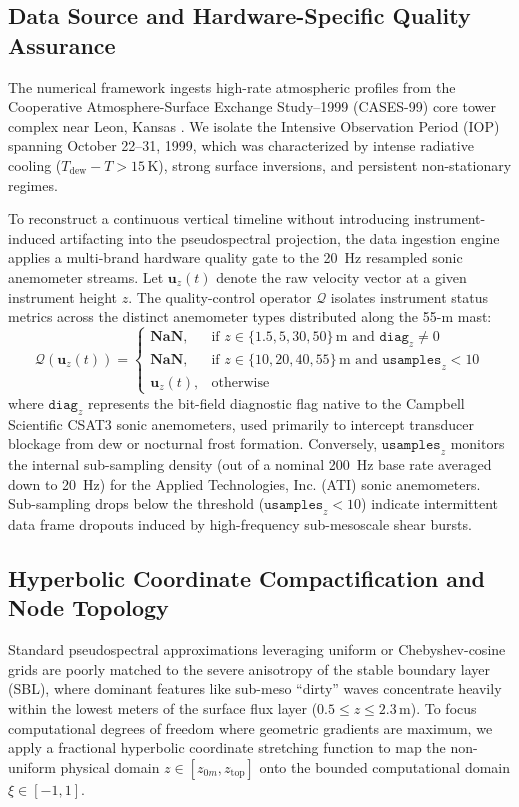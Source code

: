 \subsection{Data Source and Hardware-Specific Quality Assurance}
The numerical framework ingests high-rate atmospheric profiles from the Cooperative Atmosphere-Surface Exchange Study--1999 (CASES-99) core tower complex near Leon, Kansas \citep{poulos2002cases}. We isolate the Intensive Observation Period (IOP) spanning October 22--31, 1999, which was characterized by intense radiative cooling ($T_{\text{dew}} - T > 15\,\text{K}$), strong surface inversions, and persistent non-stationary regimes.

To reconstruct a continuous vertical timeline without introducing instrument-induced artifacting into the pseudospectral projection, the data ingestion engine applies a multi-brand hardware quality gate to the 20~Hz resampled sonic anemometer streams. Let $\mathbf{u}_z(t)$ denote the raw velocity vector at a given instrument height $z$. The quality-control operator $\mathcal{Q}$ isolates instrument status metrics across the distinct anemometer types distributed along the 55-m mast:
\begin{equation}
\mathcal{Q}\left(\mathbf{u}_z(t)\right) =
\begin{cases}
\mathbf{NaN}, & \text{if } z \in \{1.5, 5, 30, 50\}\,\text{m and } \mathtt{diag}_z \neq 0 \\
\mathbf{NaN}, & \text{if } z \in \{10, 20, 40, 55\}\,\text{m and } \mathtt{usamples}_z < 10 \\
\mathbf{u}_z(t), & \text{otherwise}
\end{cases}
\end{equation}
where $\mathtt{diag}_z$ represents the bit-field diagnostic flag native to the Campbell Scientific CSAT3 sonic anemometers, used primarily to intercept transducer blockage from dew or nocturnal frost formation. Conversely, $\mathtt{usamples}_z$ monitors the internal sub-sampling density (out of a nominal 200~Hz base rate averaged down to 20~Hz) for the Applied Technologies, Inc. (ATI) sonic anemometers. Sub-sampling drops below the threshold ($\mathtt{usamples}_z < 10$) indicate intermittent data frame dropouts induced by high-frequency sub-mesoscale shear bursts.

\subsection{Hyperbolic Coordinate Compactification and Node Topology}
Standard pseudospectral approximations leveraging uniform or Chebyshev-cosine grids are poorly matched to the severe anisotropy of the stable boundary layer (SBL), where dominant features like sub-meso ``dirty'' waves concentrate heavily within the lowest meters of the surface flux layer ($0.5 \le z \le 2.3\,\text{m}$). To focus computational degrees of freedom where geometric gradients are maximum, we apply a fractional hyperbolic coordinate stretching function to map the non-uniform physical domain $z \in [z_{0m}, z_{\text{top}}]$ onto the bounded computational domain $\xi \in [-1, 1]$.

